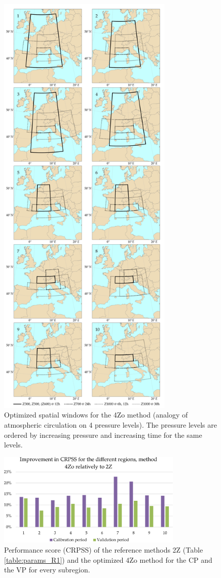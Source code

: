 \documentclass[review]{elsarticle}
\begin{document}
\begin{figure}[t]
	\centerline{\includegraphics[width=8.4cm]{figures/fig02.pdf}}
	\caption{Optimized spatial windows for the 4Zo method (analogy of atmospheric circulation on 4 pressure levels). The pressure levels are ordered by increasing pressure and increasing time for the same levels.}
	\label{fig:spatial_windows_4Zo}
\end{figure}

\begin{figure}[t]
	\centerline{\includegraphics[width=8.8cm]{figures/fig03.pdf}}
	\caption{Performance score (CRPSS) of the reference methods 2Z (Table \ref{table:params_R1}) and the optimized 4Zo method for the CP and the VP for every subregion.}
	\label{fig:figure_crpss_4Zo}
\end{figure}
\end{document}
